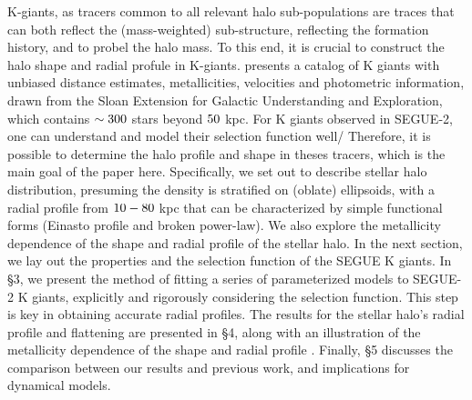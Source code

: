 \documentclass[12pt,preprint]{aastex}
\begin{document}
K-giants, as tracers common to all relevant halo sub-populations are traces that can both reflect the (mass-weighted) sub-structure, reflecting the formation history, and to probel the halo mass. To this end, it is crucial to construct the halo shape and radial profule in K-giants. \citet{Xue2014} presents a catalog of K giants with unbiased distance estimates, metallicities, velocities and photometric information, drawn from the Sloan Extension for Galactic Understanding and Exploration\citep[][SEGUE]{Yanny2009b}, which contains $\rm \sim 300$ stars beyond $\rm 50~$kpc.
For K giants observed in SEGUE-2, one can understand and model their selection function well/ Therefore, it is possible to determine the halo profile and shape in theses tracers, which is the main goal of the paper here.
Specifically, we set out to describe stellar halo distribution, presuming the density is stratified on (oblate) ellipsoids, with a radial profile from $\rm 10-80~$kpc that can be characterized by simple  functional forms (Einasto profile and broken power-law). We also explore the metallicity dependence of the shape and radial profile of the stellar halo.
In the next section, we lay out the properties and the selection function of the SEGUE K giants. In \S 3, we present the method of fitting a series of parameterized models to SEGUE-2 K giants, explicitly and rigorously considering the selection function. This step is key in obtaining accurate radial profiles. The results for the stellar halo's radial profile and flattening are presented in \S 4, along with an illustration of the metallicity dependence of the shape and radial profile . Finally, \S 5 discusses the comparison between our results and previous work, and implications for dynamical models.
\end{document}
